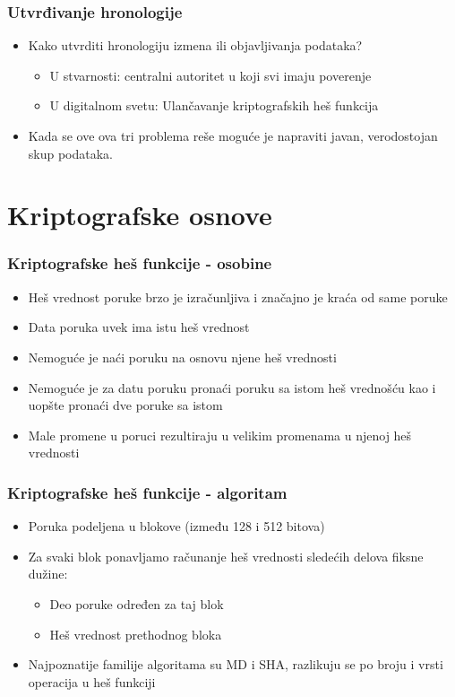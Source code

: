 \documentclass{beamer}
\begin{document}
\begin{frame}[fragile]\frametitle{Utvrđivanje hronologije}
	\begin{itemize}
		\item Kako utvrditi hronologiju izmena ili objavljivanja podataka?
		\begin{itemize}
			\item U stvarnosti: centralni autoritet u koji svi imaju poverenje
			\item U digitalnom svetu: Ulančavanje kriptografskih heš funkcija
		\end{itemize}
		\item Kada se ove ova tri problema reše moguće je napraviti javan, verodostojan skup podataka.
	\end{itemize}
\end{frame}


\section{Kriptografske osnove}

\begin{frame}[fragile]\frametitle{Kriptografske heš funkcije - osobine}
	\begin{itemize}
            \item Heš vrednost poruke brzo je izračunljiva i značajno je kraća od same poruke
            \item Data poruka uvek ima istu heš vrednost
            \item Nemoguće je naći poruku na osnovu njene heš vrednosti
            \item Nemoguće je za datu poruku pronaći poruku sa istom heš vrednošću kao i uopšte pronaći dve poruke sa istom
            \item Male promene u poruci rezultiraju u velikim promenama u njenoj heš vrednosti
        \end{itemize}
\end{frame}

\begin{frame}[fragile]\frametitle{Kriptografske heš funkcije - algoritam}
	 \begin{itemize}
            \item Poruka podeljena u blokove (između 128 i 512 bitova)
            \item Za svaki blok ponavljamo računanje heš vrednosti sledećih delova fiksne dužine:
            \begin{itemize}
                \item Deo poruke određen za taj blok
                \item Heš vrednost prethodnog bloka
            \end{itemize}
            \item Najpoznatije familije algoritama su MD i SHA, razlikuju se po broju i vrsti operacija u heš funkciji
        \end{itemize}
	
\end{frame}
\end{document}
